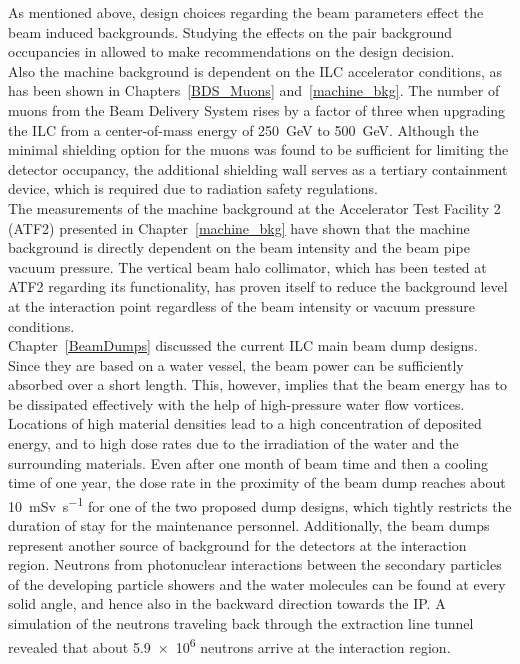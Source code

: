 As mentioned above, design choices regarding the beam parameters effect the beam induced backgrounds.
Studying the effects on the pair background occupancies in \sid allowed to make recommendations on the design decision.
\\Also the machine background is dependent on the ILC accelerator conditions, as has been shown in Chapters~\ref{BDS_Muons} and~\ref{machine_bkg}.
The number of muons from the Beam Delivery System rises by a factor of three when upgrading the ILC from a center-of-mass energy of \SI{250}{\GeV} to \SI{500}{\GeV}.
Although the minimal shielding option for the muons was found to be sufficient for limiting the \sid detector occupancy, the additional shielding wall serves as a tertiary containment device, which is required due to radiation safety regulations.
\\The measurements of the machine background at the Accelerator Test Facility 2 (ATF2) presented in Chapter~\ref{machine_bkg} have shown that the machine background is directly dependent on the beam intensity and the beam pipe vacuum pressure.
The vertical beam halo collimator, which has been tested at ATF2 regarding its functionality, has proven itself to reduce the background level at the interaction point regardless of the beam intensity or vacuum pressure conditions.
\\Chapter~\ref{BeamDumps} discussed the current ILC main beam dump designs.
Since they are based on a water vessel, the beam power can be sufficiently absorbed over a short length.
This, however, implies that the beam energy has to be dissipated effectively with the help of high-pressure water flow vortices.
Locations of high material densities lead to a high concentration of deposited energy, and to high dose rates due to the irradiation of the water and the surrounding materials. 
Even after one month of beam time and then a cooling time of one year, the dose rate in the proximity of the beam dump reaches about \SI{10}{\milli\sievert\per\second} for one of the two proposed dump designs, which tightly restricts the duration of stay for the maintenance personnel.
Additionally, the beam dumps represent another source of background for the detectors at the interaction region.
Neutrons from photonuclear interactions between the secondary particles of the developing particle showers and the water molecules can be found at every solid angle, and hence also in the backward direction towards the IP.
A simulation of the neutrons traveling back through the extraction line tunnel revealed that about \num{5.9e6} neutrons arrive at the interaction region.
